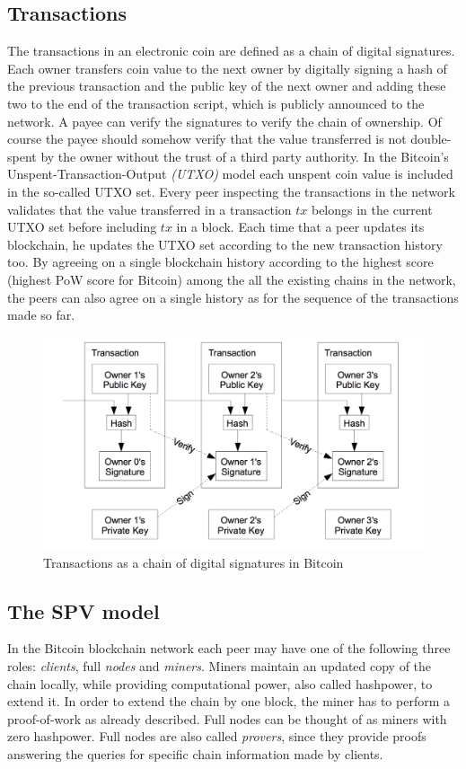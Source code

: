 \subsection{Transactions}
The transactions in an electronic coin are defined as a chain of digital signatures. Each owner transfers coin value to the next owner by digitally signing a hash of the previous transaction and the public key of the next owner and adding these two to the end of the transaction script, which is publicly announced to the network. A payee can verify the signatures to verify the chain of ownership. Of course the payee should somehow verify that the value transferred is not double-spent by the owner without the trust of a third party authority. In the Bitcoin's Unspent-Transaction-Output \emph{(UTXO)} model each unspent coin value is included in the so-called UTXO set. Every peer inspecting the transactions in the network validates that the value transferred in a transaction $tx$ belongs in the current UTXO set before including $tx$ in a block. Each time that a peer updates its blockchain, he updates the UTXO set according to the new transaction history too. By agreeing on a single blockchain history according to the highest score (highest PoW score for Bitcoin) among the all the existing chains in the network, the peers can also agree on a single history as for the sequence of the transactions made so far.

\begin{figure}[h!]
	\begin{center}
		\includegraphics[scale=0.3]{figures/txs.png}
	\end{center}
	\caption{Transactions as a chain of digital signatures in Bitcoin~\cite{nakamoto}}
	\label{fig:txs_nakamoto}
\end{figure}


\subsection{The SPV model}
In the Bitcoin blockchain network each peer may have one of the following three roles: \textit{clients}, full \textit{nodes} and \textit{miners}. Miners maintain an updated copy of the chain locally, while providing computational power, also called hashpower, to extend it. In order to extend the chain by one block, the miner has to perform a proof-of-work as already described. Full nodes can be thought of as miners with zero hashpower. Full nodes are also called \textit{provers}, since they provide proofs  answering the queries for specific chain information made by clients.

